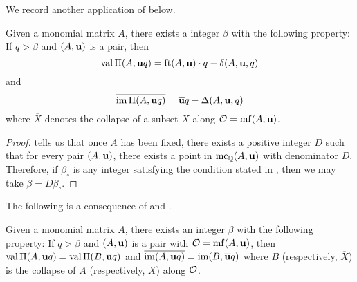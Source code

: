 \documentclass[11pt]{amsart}
\renewcommand{\!}[1]{{\color{red}\text{$\star$\,}#1\,$\star$}}
\newcommand{\ol}[1]{\overline{#1}}
\begin{document}
We record another application of  below.

\begin{theorem}
\label{uniform uniform value and image: T}
Given a monomial matrix $A$, there exists a integer $\beta$ with the following property:  If $q > \beta$ and $(A, \mathbf{u})$ is a pair, then \[ \operatorname{val} \Pi(A, \mathbf{u}q) = \operatorname{ft}(A, \mathbf{u}) \cdot q - \delta(A, \mathbf{u}, q) \] and
\[ \ol{ \im \IP(A, \vv{u}q)} = \ol{\vv{u}}q - \Delta(A, \vv{u},q) \] where $\ol{X}$ denotes the collapse of a subset $X$ along $\mathcal{O} = \operatorname{mf}(A, \mathbf{u})$.
\end{theorem}

\begin{proof}  
  tells us that once $A$ has been fixed, there exists a positive integer $D$ such that for every pair $(A, \mathbf{u})$, there exists a point in $\operatorname{mc}_{\mathbb{Q}}(A, \mathbf{u})$ with denominator $D$.  Therefore, if $\beta_{\circ}$  is any integer satisfying the condition stated in , then we may take $\beta = D \beta_{\circ}$.  
\end{proof}

The following is a consequence of  and .

\begin{corollary}
Given a monomial matrix $A$, there exists an integer $\beta$ with the following property\textup:  If $q > \beta$ and $(A, \mathbf{u})$ is a pair with $\mathcal{O} = \operatorname{mf}(A, \mathbf{u})$, then $\val \IP(A, \vv{u}q) = \val \IP(B, \ol{\vv{u}}q)$ and $\ol{ \im(A, \vv{u}q)} = \im(B, \ol{\vv{u}}q)$ where $B$ (respectively, $\ol{X}$) is the collapse of $A$  (respectively, $X$) along $\mathcal{O}$.
\end{corollary}



\newpage
\end{document}
